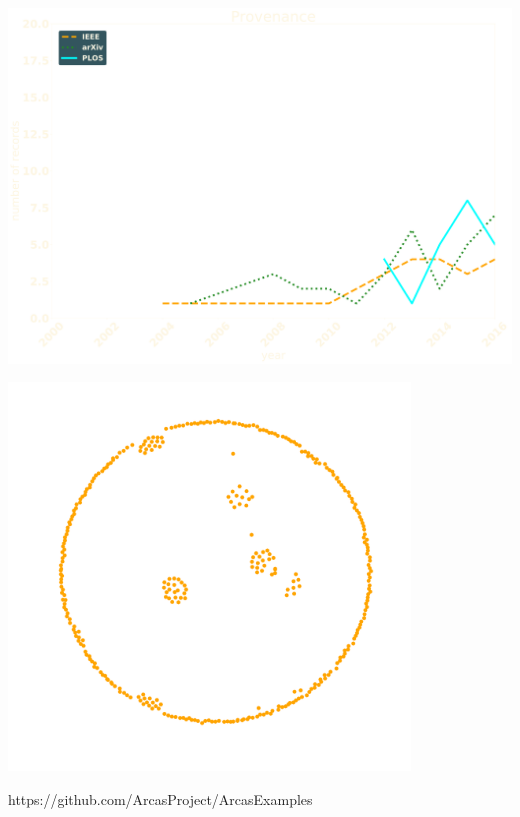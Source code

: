 \documentclass{beamer}
\begin{document}
\begin{frame}
\begin{center}
    \includegraphics[width=\textwidth]{static/provenance.pdf}
\end{center}
\end{frame}

\begin{frame}
\begin{center}
    \includegraphics[width=0.8\textwidth]{static/network.pdf}
\end{center}
\end{frame}

\begin{frame}
\begin{center}
    \large{https://github.com/ArcasProject/ArcasExamples}
\end{center}
\end{frame}
\end{document}
